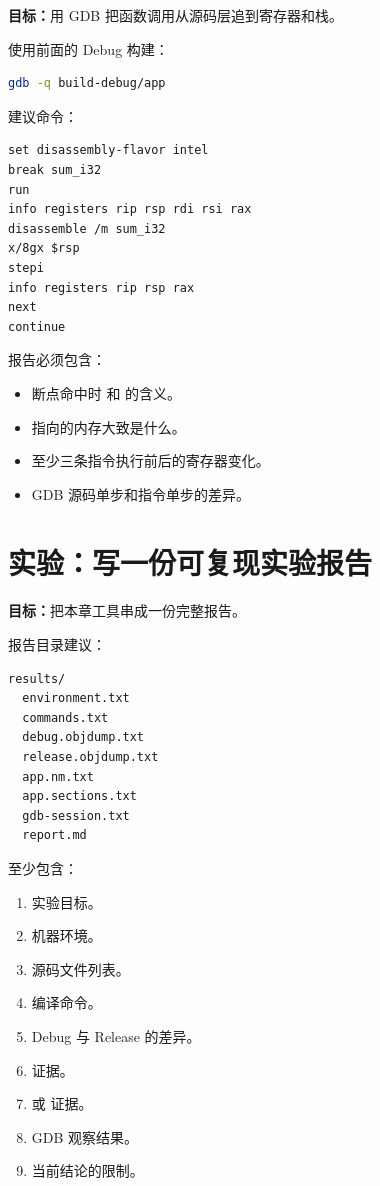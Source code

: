 \begin{labbox}
\textbf{目标：}用 GDB 把函数调用从源码层追到寄存器和栈。

使用前面的 Debug 构建：

\begin{lstlisting}[language=bash]
gdb -q build-debug/app
\end{lstlisting}

建议命令：

\begin{lstlisting}
set disassembly-flavor intel
break sum_i32
run
info registers rip rsp rdi rsi rax
disassemble /m sum_i32
x/8gx $rsp
stepi
info registers rip rsp rax
next
continue
\end{lstlisting}

报告必须包含：

\begin{itemize}
  \item 断点命中时  和  的含义。
  \item {} 指向的内存大致是什么。
  \item 至少三条指令执行前后的寄存器变化。
  \item GDB 源码单步和指令单步的差异。
\end{itemize}
\end{labbox}

\section{实验：写一份可复现实验报告}

\begin{labbox}
\textbf{目标：}把本章工具串成一份完整报告。

报告目录建议：

\begin{lstlisting}
results/
  environment.txt
  commands.txt
  debug.objdump.txt
  release.objdump.txt
  app.nm.txt
  app.sections.txt
  gdb-session.txt
  report.md
\end{lstlisting}

 至少包含：

\begin{enumerate}
  \item 实验目标。
  \item 机器环境。
  \item 源码文件列表。
  \item 编译命令。
  \item Debug 与 Release 的差异。
  \item {} 证据。
  \item {} 或  证据。
  \item GDB 观察结果。
  \item 当前结论的限制。
\end{enumerate}
\end{labbox}

